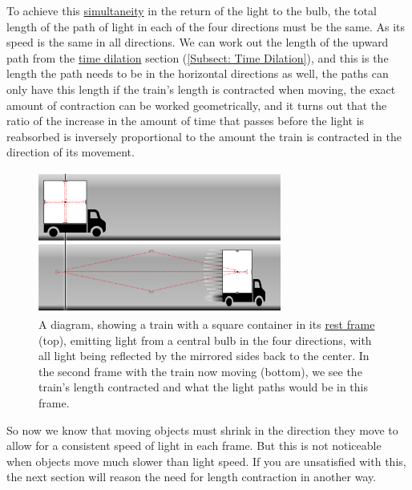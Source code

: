 To achieve this \hyperlink{def-simultaneity}{simultaneity} in the return of the light to the bulb, the total length of the path of light in each of the four directions must be the same.
As its speed is the same in all directions.
We can work out the length of the upward path from the \hyperlink{def-time-dilation}{time dilation} section (\ref{Subsect: Time Dilation}), and this is the length the path needs to be in the horizontal directions as well, the paths can only have this length if the train's length is contracted when moving, the exact amount of contraction can be worked geometrically, and it turns out that the ratio of the increase in the amount of time that passes before the light is reabsorbed is inversely proportional to the amount the train is contracted in the direction of its movement.

\begin{figure}[H]
	\centering
	\includegraphics[width=8cm]{images/pdf/Full_Lorry_Transform.pdf}
	\caption{A diagram, showing a train with a square container in its \protect\hyperlink{def-proper-frame}{rest frame} (top), emitting light from a central bulb in the four directions, with all light being reflected by the mirrored sides back to the center. In the second frame with the train now moving (bottom), we see the train's length contracted and what the light paths would be in this frame.}
	\label{fig: full train transform}
\end{figure}

So now we know that moving objects must shrink in the direction they move to allow for a consistent speed of light in each frame.
But this is not noticeable when objects move much slower than light speed.
If you are unsatisfied with this, the next section will reason the need for length contraction in another way.


